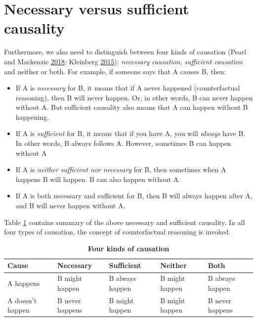 \documentclass[
]{book}
\providecommand{\tightlist}{%
  \setlength{\itemsep}{0pt}\setlength{\parskip}{0pt}}
\begin{document}
\hypertarget{necessary-versus-sufficient-causality}{%
\section{Necessary versus sufficient causality}\label{necessary-versus-sufficient-causality}}

Furthermore, we also need to distinguish between four kinds of causation (Pearl and Mackenzie \protect\hyperlink{ref-pearlBookWhyNew2018}{2018}; Kleinberg \protect\hyperlink{ref-kleinbergWhyGuideFinding2015}{2015}): \emph{necessary causation}, \emph{sufficient causation} and neither or both. For example, if someone says that A causes B, then:

\begin{itemize}
\tightlist
\item
  If A is \emph{necessary} for B, it means that if A never happened (counterfactual reasoning), then B will never happen. Or, in other words, B can never happen without A. But sufficient causality also means that A can happen without B happening.
\item
  If A is \emph{sufficient} for B, it means that if you have A, you will \emph{always} have B. In other words, B always follows A. However, sometimes B can happen without A
\item
  If A is \emph{neither sufficient nor necessary} for B, then sometimes when A happens B will happen. B can also happen without A.
\item
  If A is both necessary and sufficient for B, then B will always happen after A, and B will never happen without A.
\end{itemize}

Table \ref{tab:four-causes-table} contains summary of the above necessary and sufficient causality. In all four types of causation, the concept of counterfactual reasoning is invoked.



\begin{table}

\caption{\label{tab:four-causes-table}\textbf{Four kinds of causation}}
\centering
\begin{tabular}[t]{lllll}
\toprule
Cause & Necessary & Sufficient & Neither & Both\\
\midrule
A happens & B might happen & B always happen & B might happen & B always happen\\
A doesn't happen & B never happens & B might happen & B might happen & B never happens\\
\bottomrule
\end{tabular}
\end{table}
\end{document}
